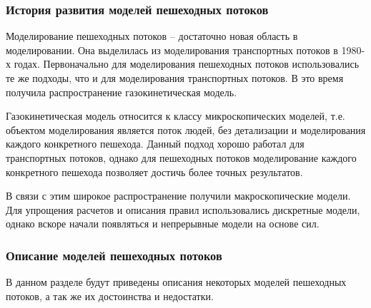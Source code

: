 \subsubsection{История развития моделей пешеходных потоков}
\label{sub:domain:models:history}

Моделирование пешеходных потоков – достаточно новая область в моделировании. Она выделилась из моделирования транспортных потоков в 1980-х годах.
Первоначально для моделирования пешеходных потоков использовались те же подходы, что и для моделирования транспортных потоков.
В это время получила распространение газокинетическая модель.

Газокинетическая модель относится к классу микроскопических моделей, т.е. объектом моделирования является поток людей, без детализации и моделирования каждого конкретного пешехода.
Данный подход хорошо работал для транспортных потоков, однако для пешеходных потоков моделирование каждого конкретного пешехода позволяет достичь более точных результатов.

В связи с этим широкое распространение получили макроскопические модели. Для упрощения расчетов и описания правил использовались дискретные модели, однако вскоре начали появляться и непрерывные модели на основе сил.

\subsubsection{Описание моделей пешеходных потоков}
\label{sub:domain:models:descriptions}

В данном разделе будут приведены описания некоторых моделей пешеходных потоков, а так же их достоинства и недостатки.


